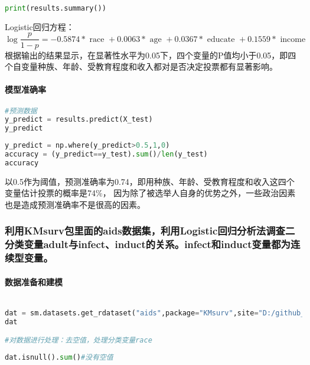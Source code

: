 \documentclass[UTF8,a4paper,12pt]{ctexart}  %
\begin{document}
\begin{lstlisting}[language=Python]
print(results.summary())
\end{lstlisting}

Logistic回归方程：
\[\log \frac{p}{1-p}=-0.5874 * \text { race }+0.0063 * \text { age }+0.0367 * \text { educate }+0.1559 * \text { income }
\]
根据输出的结果显示，在显著性水平为0.05下，四个变量的P值均小于0.05，即四个自变量种族、年龄、受教育程度和收入都对是否决定投票都有显著影响。

\paragraph{模型准确率}

\begin{lstlisting}[language=Python]
#预测数据
y_predict = results.predict(X_test)
y_predict
\end{lstlisting}

\begin{lstlisting}[language=Python]
y_predict = np.where(y_predict>0.5,1,0)
accuracy = (y_predict==y_test).sum()/len(y_test)
accuracy
\end{lstlisting}

以0.5作为阈值，预测准确率为0.74，即用种族、年龄、受教育程度和收入这四个变量估计投票的概率是74\%， 因为除了被选举人自身的优势之外，一些政治因素也是造成预测准确率不是很高的因素。

\hypertarget{kmsurvaidslogisticadultinfectinductinfectinduct}{%
\subsubsection{利用KMsurv包里面的aids数据集，利用Logistic回归分析法调查二分类变量adult与infect、induct的关系。infect和induct变量都为连续型变量。}\label{kmsurvaidslogisticadultinfectinductinfectinduct}}

\paragraph{数据准备和建模}

\begin{lstlisting}[language=Python]

dat = sm.datasets.get_rdataset("aids",package="KMsurv",site="D:/github_repo/Rdatasets").data
dat

#对数据进行处理：去空值，处理分类变量race
\end{lstlisting}

\begin{lstlisting}[language=Python]
dat.isnull().sum()#没有空值
\end{lstlisting}
\end{document}
